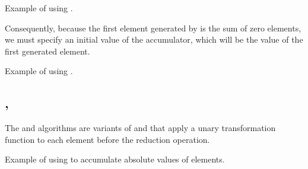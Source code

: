 \begin{box-note}
\footnotesize Example of using .
\tcblower
{}
\end{box-note}

Consequently, because the first element generated by  is the sum of zero elements, we must specify an initial value of the accumulator, which will be the value of the first generated element.

\begin{box-note}
\footnotesize Example of using .
\tcblower
{}
\end{box-note}

\subsection{\texorpdfstring{,\newline{}}{\texttt{std::transform\_inclusive\_scan},\newline \texttt{std::transform\_exclusive\_scan}}}

The  and  algorithms are variants of  and  that apply a unary transformation function to each element before the reduction operation.


\begin{box-note}
\footnotesize Example of using  to accumulate absolute values of elements.
\tcblower
{}
\end{box-note}
